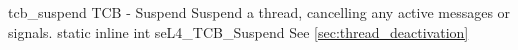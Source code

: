 %
%
%
%

\apidoc
{tcb_suspend}
{TCB - Suspend}
{Suspend a thread, cancelling any active messages or signals.}
{static inline int seL4\_TCB\_Suspend}
{
}
{\errorenumdesc}
{See \autoref{sec:thread_deactivation}}
